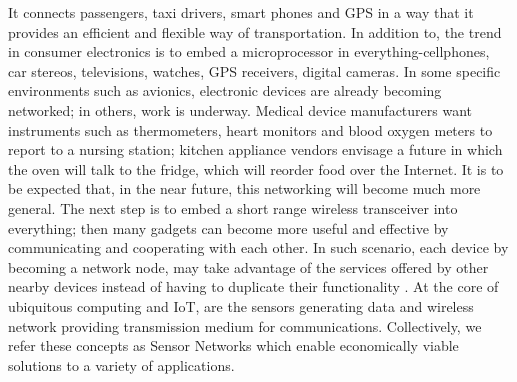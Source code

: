 	It connects passengers, taxi drivers, smart phones and GPS in a way that it provides an efficient and flexible way of transportation.
	In addition to, the trend in consumer electronics is to embed a microprocessor in everything-cellphones, car stereos,  televisions, watches, GPS receivers, digital cameras.
	In some specific environments such as avionics, electronic devices are already becoming networked; in others, work is underway.
	Medical device manufacturers want instruments such as thermometers, heart monitors and blood oxygen meters to report to a nursing station; kitchen appliance vendors envisage a future in which the oven will talk to the fridge, which will reorder food over the Internet. 
	It is to be expected that, in the near future, this networking will become much more general.
	The next step is to embed a short range wireless transceiver into everything; then many gadgets can become more useful and effective by communicating and cooperating with each other.
	In such scenario, each device by becoming a network node, may take advantage of the services offered by other nearby devices instead of having to duplicate their functionality \cite{2002-Stajano-ubiquitous}.
	At the core of ubiquitous computing and IoT, are the sensors generating data and wireless network providing transmission medium for communications. 
	Collectively, we refer these concepts as Sensor Networks which enable economically viable solutions to a variety of applications.


